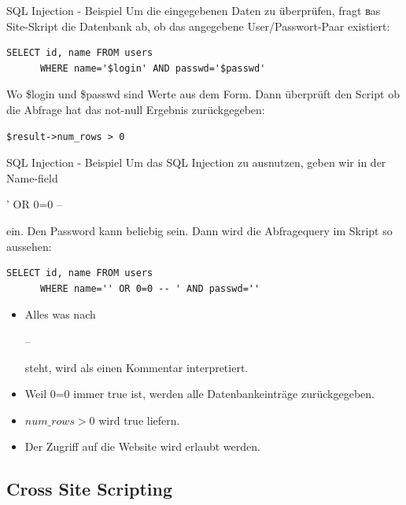 \documentclass[10pt]{beamer}
\begin{document}
\begin{frame}[fragile]{SQL Injection - Beispiel}
  Um die eingegebenen Daten zu \"uberpr\"ufen, fragt вas Site-Skript die Datenbank ab, ob das angegebene User/Passwort-Paar existiert:
  \newline
  \begin{lstlisting}[style=SQLStyle]
    SELECT id, name FROM users 
      WHERE name='$login' AND passwd='$passwd'
  \end{lstlisting}
  Wo \$login und \$passwd sind Werte aus dem Form.
  \newline
  Dann \"uberpr\"uft den Script ob die Abfrage hat das not-null Ergebnis zur\"uckgegeben:
  \newline
  \begin{lstlisting}[style=PHPStyle]
    $result->num_rows > 0
  \end{lstlisting}
\end{frame}

\begin{frame}[fragile]{SQL Injection - Beispiel}
  Um das SQL Injection zu ausnutzen, geben wir in der Name-field {\fboxsep=0pt\colorbox{mGreen!50}{\strut ' OR 0=0 -- }} ein.
  Den Password kann beliebig sein.
  \newline
  Dann wird die Abfragequery im Skript so aussehen:
  \newline
  \begin{lstlisting}[style=SQLStyle]
    SELECT id, name FROM users 
      WHERE name='' OR 0=0 -- ' AND passwd=''
  \end{lstlisting}
  \begin{itemize}
    \item Alles was nach {\fboxsep=0pt\colorbox{mGreen!50}{\strut -- }} steht, wird als einen Kommentar interpretiert.
    \item Weil 0=0 immer true ist, werden alle Datenbankeintr\"age zur\"uckgegeben.
    \item $num\_rows>0$ wird true liefern.
    \item Der Zugriff auf die Website wird erlaubt werden.
  \end{itemize}
  
\end{frame}


\subsection{Cross Site Scripting}
\end{document}
